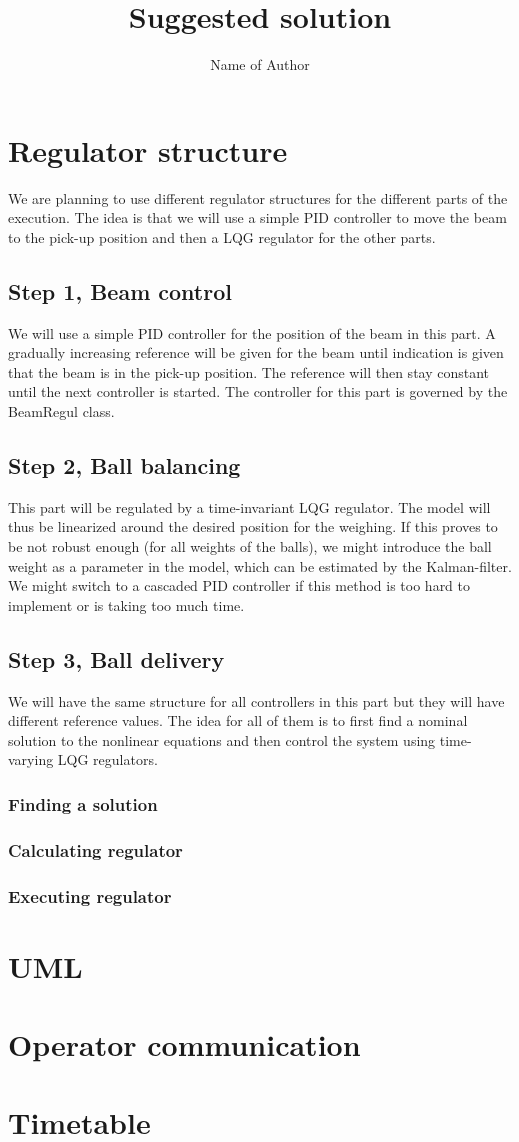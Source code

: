\documentclass{article}
\title{Suggested solution}
\author{Name of Author}
\begin{document}
\maketitle

\section{Regulator structure}
We are planning to use different regulator structures for the different parts of the execution. The idea is that we will use a simple PID controller to move the beam to the pick-up position and then a LQG regulator for the other parts.
\subsection{Step 1, Beam control}
We will use a simple PID controller for the position of the beam in this part. A gradually increasing reference will be given for the beam until indication is given that the beam is in the pick-up position. The reference will then stay constant until the next controller is started. The controller for this part is governed by the BeamRegul class.
\subsection{Step 2, Ball balancing}\label{step2}
This part will be regulated by a time-invariant LQG regulator. The model will thus be linearized around the desired position for the weighing. If this proves to be not robust enough (for all weights of the balls), we might introduce the ball weight as a parameter in the model, which can be estimated by the Kalman-filter. We might switch to a cascaded PID controller if this method is too hard to implement or is taking too much time.
\subsection{Step 3, Ball delivery}
We will have the same structure for all controllers in this part but they will have different reference values. The idea for all of them is to first find a nominal solution to the nonlinear equations and then control the system using time-varying LQG regulators.
\subsubsection{Finding a solution}
\subsubsection{Calculating regulator}
\subsubsection{Executing regulator}

\section{UML}


\section{Operator communication
}

\section{Timetable}
\end{document}
